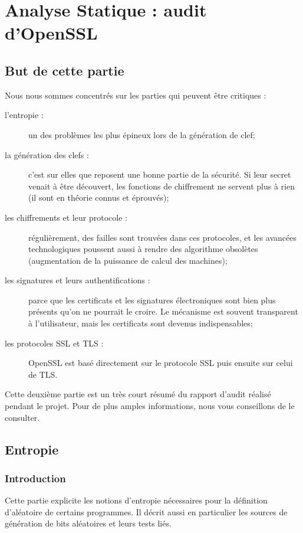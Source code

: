 \chapter{Analyse Statique : audit d'OpenSSL}

\section{But de cette partie}
Nous nous sommes concentrés sur les parties qui peuvent être critiques : 
\begin{description}
	\item [l'entropie :] un des problèmes les plus épineux lors de la génération de clef;
	\item [la génération des clefs : ] c'est sur elles que reposent une bonne partie de la sécurité. Si leur secret venait à être découvert, les fonctions de chiffrement ne servent plus à rien (il sont en théorie connus et éprouvés);
	\item [les chiffrements et leur protocole :] régulièrement, des failles sont trouvées dans ces protocoles, et les avancées technologiques poussent aussi à rendre des algorithme obsolètes (augmentation de la puissance de calcul des machines);
	\item [les signatures et leurs authentifications : ] parce que les certificats et les signatures électroniques sont bien plus présents qu'on ne pourrait le croire. Le mécanisme est souvent transparent à l'utilisateur, mais les certificats sont devenus indispensables;
	\item [les protocoles SSL et TLS : ] OpenSSL est basé directement sur le protocole SSL puis ensuite sur celui de TLS.\\
\end{description}
Cette deuxième partie est un très court résumé du rapport d'audit réalisé pendant le projet. Pour de plus amples informations, nous vous conseillons de le consulter.


\section{Entropie}
\subsection{Introduction}
Cette partie explicite les notions d'entropie nécessaires pour la définition d'aléatoire de certains programmes. Il décrit aussi en particulier les sources de génération de bits aléatoires et leurs tests liés. \\



